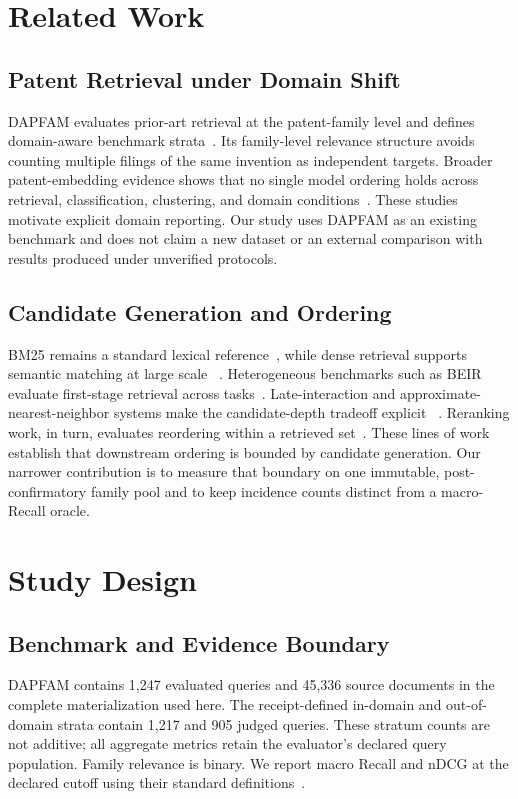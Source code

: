 \documentclass[a4paper,conference]{IEEEtran}
\begin{document}
\section{Related Work}
\subsection{Patent Retrieval under Domain Shift}
DAPFAM evaluates prior-art retrieval at the patent-family level and defines
domain-aware benchmark strata~\cite{ayaou2025dapfam}. Its family-level relevance
structure avoids counting multiple filings of the same invention as independent
targets. Broader patent-embedding evidence shows that no single model ordering
holds across retrieval, classification, clustering, and domain
conditions~\cite{yousefiramandi2026patent}. These studies motivate explicit
domain reporting. Our study uses DAPFAM as an existing benchmark and does not
claim a new dataset or an external comparison with results produced under
unverified protocols.

\subsection{Candidate Generation and Ordering}
BM25 remains a standard lexical reference~\cite{robertson2009probabilistic},
while dense retrieval supports semantic matching at large scale
~\cite{karpukhin2020dense}. Heterogeneous benchmarks such as BEIR evaluate
first-stage retrieval across tasks~\cite{thakur2021beir}. Late-interaction and
approximate-nearest-neighbor systems make the candidate-depth tradeoff explicit
~\cite{khattab2020colbert,xiong2021ance}. Reranking work, in turn, evaluates
reordering within a retrieved set~\cite{nogueira2019passage}. These lines of
work establish that downstream ordering is bounded by candidate generation.
Our narrower contribution is to measure that boundary on one immutable,
post-confirmatory family pool and to keep incidence counts distinct from a
macro-Recall oracle.

\section{Study Design}
\subsection{Benchmark and Evidence Boundary}
DAPFAM contains 1,247 evaluated queries and 45,336 source documents in the
complete materialization used here. The receipt-defined in-domain and
out-of-domain strata contain 1,217 and 905 judged queries. These stratum counts
are not additive; all aggregate metrics retain the evaluator's declared query
population. Family relevance is binary. We report macro Recall and nDCG at the
declared cutoff using their standard definitions~\cite{jarvelin2002cumulated}.
\end{document}
